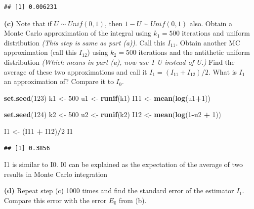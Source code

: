 \documentclass[
]{article}
\newenvironment{Shaded}{\begin{snugshade}}{\end{snugshade}}
\newcommand{\DecValTok}[1]{\textcolor[rgb]{0.00,0.00,0.81}{#1}}
\newcommand{\KeywordTok}[1]{\textcolor[rgb]{0.13,0.29,0.53}{\textbf{#1}}}
\newcommand{\NormalTok}[1]{#1}
\newcommand{\OperatorTok}[1]{\textcolor[rgb]{0.81,0.36,0.00}{\textbf{#1}}}
\newcommand{\StringTok}[1]{\textcolor[rgb]{0.31,0.60,0.02}{#1}}
\begin{document}
\begin{verbatim}
## [1] 0.006231
\end{verbatim}

\textbf{(c)} Note that if \(U \sim Unif(0,1)\), then
\(1 - U \sim Unif(0,1)\) also. Obtain a Monte Carlo approximation of the
integral using \(k_1 = 500\) iterations and uniform distribution
\emph{(This step is same as part (a))}. Call this \(I_{11}\). Obtain
another MC approximation (call this \(I_{12}\)) using \(k_2 = 500\)
iterations and the antithetic uniform distribution \emph{(Which means in
part (a), now use 1-U instead of U.)} Find the average of these two
approximations and call it \(I_1 = (I_{11}+I_{12})/2\). What is \(I_1\)
an approximation of? Compare it to \(I_0\).

\begin{Shaded}
\begin{Highlighting}[]
\KeywordTok{set.seed}\NormalTok{(}\DecValTok{123}\NormalTok{)}
\NormalTok{k1 <-}\StringTok{ }\DecValTok{500}
\NormalTok{u1 <-}\StringTok{ }\KeywordTok{runif}\NormalTok{(k1)}
\NormalTok{I11 <-}\StringTok{ }\KeywordTok{mean}\NormalTok{(}\KeywordTok{log}\NormalTok{(u1}\OperatorTok{+}\DecValTok{1}\NormalTok{))}

\KeywordTok{set.seed}\NormalTok{(}\DecValTok{124}\NormalTok{)}
\NormalTok{k2 <-}\StringTok{ }\DecValTok{500}
\NormalTok{u2 <-}\StringTok{ }\KeywordTok{runif}\NormalTok{(k2)}
\NormalTok{I12 <-}\StringTok{ }\KeywordTok{mean}\NormalTok{(}\KeywordTok{log}\NormalTok{(}\DecValTok{1}\OperatorTok{-}\NormalTok{u2 }\OperatorTok{+}\StringTok{ }\DecValTok{1}\NormalTok{))}

\NormalTok{I1 <-}\StringTok{ }\NormalTok{(I11 }\OperatorTok{+}\StringTok{ }\NormalTok{I12)}\OperatorTok{/}\DecValTok{2}
\NormalTok{I1}
\end{Highlighting}
\end{Shaded}

\begin{verbatim}
## [1] 0.3856
\end{verbatim}

I1 is similar to I0. I0 can be explained as the expectation of the
average of two results in Monte Carlo integration

\textbf{(d)} Repeat step (c) 1000 times and find the standard error of
the estimator \(I_1\). Compare this error with the error \(E_0\) from
(b).
\end{document}
